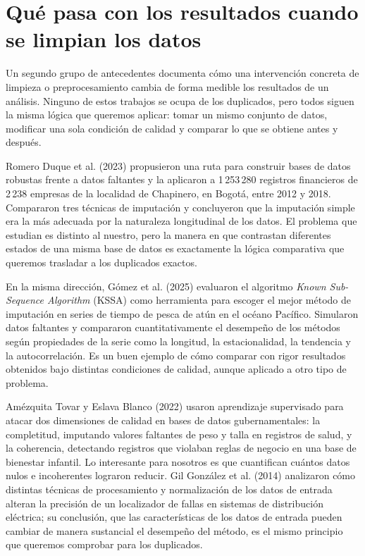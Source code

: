 \documentclass[11pt,openany,oneside,letterpaper]{book}
\begin{document}
\section{Qué pasa con los resultados cuando se limpian los datos}

Un segundo grupo de antecedentes documenta cómo una intervención concreta de limpieza o preprocesamiento cambia de forma medible los resultados de un análisis. Ninguno de estos trabajos se ocupa de los duplicados, pero todos siguen la misma lógica que queremos aplicar: tomar un mismo conjunto de datos, modificar una sola condición de calidad y comparar lo que se obtiene antes y después.

Romero Duque et al. (2023) propusieron una ruta para construir bases de datos robustas frente a datos faltantes y la aplicaron a 1\,253\,280 registros financieros de 2\,238 empresas de la localidad de Chapinero, en Bogotá, entre 2012 y 2018. Compararon tres técnicas de imputación y concluyeron que la imputación simple era la más adecuada por la naturaleza longitudinal de los datos. El problema que estudian es distinto al nuestro, pero la manera en que contrastan diferentes estados de una misma base de datos es exactamente la lógica comparativa que queremos trasladar a los duplicados exactos.

En la misma dirección, Gómez et al. (2025) evaluaron el algoritmo \emph{Known Sub-Sequence Algorithm} (KSSA) como herramienta para escoger el mejor método de imputación en series de tiempo de pesca de atún en el océano Pacífico. Simularon datos faltantes y compararon cuantitativamente el desempeño de los métodos según propiedades de la serie como la longitud, la estacionalidad, la tendencia y la autocorrelación. Es un buen ejemplo de cómo comparar con rigor resultados obtenidos bajo distintas condiciones de calidad, aunque aplicado a otro tipo de problema.

Amézquita Tovar y Eslava Blanco (2022) usaron aprendizaje supervisado para atacar dos dimensiones de calidad en bases de datos gubernamentales: la completitud, imputando valores faltantes de peso y talla en registros de salud, y la coherencia, detectando registros que violaban reglas de negocio en una base de bienestar infantil. Lo interesante para nosotros es que cuantifican cuántos datos nulos e incoherentes lograron reducir. Gil González et al. (2014) analizaron cómo distintas técnicas de procesamiento y normalización de los datos de entrada alteran la precisión de un localizador de fallas en sistemas de distribución eléctrica; su conclusión, que las características de los datos de entrada pueden cambiar de manera sustancial el desempeño del método, es el mismo principio que queremos comprobar para los duplicados.
\end{document}
